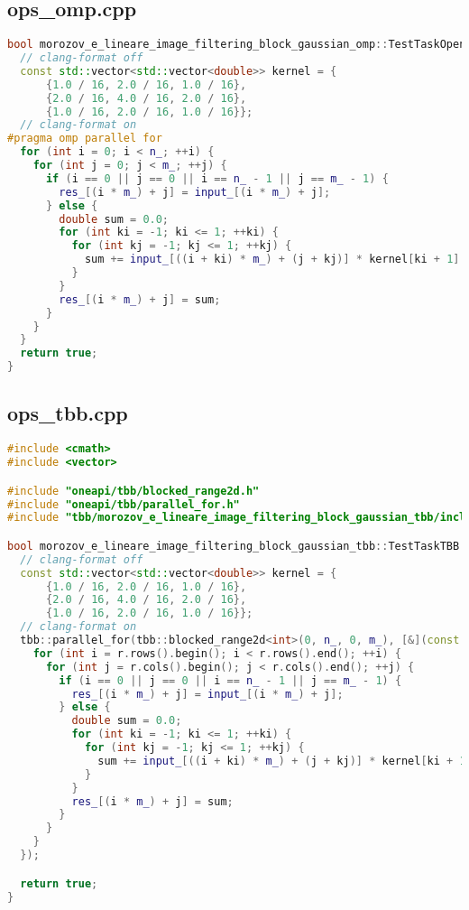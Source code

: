 \documentclass[a4paper,12pt]{article}
\begin{document}
\subsection{ops\_omp.cpp}
\begin{lstlisting}[language=C++]
bool morozov_e_lineare_image_filtering_block_gaussian_omp::TestTaskOpenMP::RunImpl() {
  // clang-format off
  const std::vector<std::vector<double>> kernel = {
      {1.0 / 16, 2.0 / 16, 1.0 / 16},
      {2.0 / 16, 4.0 / 16, 2.0 / 16},
      {1.0 / 16, 2.0 / 16, 1.0 / 16}};
  // clang-format on
#pragma omp parallel for
  for (int i = 0; i < n_; ++i) {
    for (int j = 0; j < m_; ++j) {
      if (i == 0 || j == 0 || i == n_ - 1 || j == m_ - 1) {
        res_[(i * m_) + j] = input_[(i * m_) + j];
      } else {
        double sum = 0.0;
        for (int ki = -1; ki <= 1; ++ki) {
          for (int kj = -1; kj <= 1; ++kj) {
            sum += input_[((i + ki) * m_) + (j + kj)] * kernel[ki + 1][kj + 1];
          }
        }
        res_[(i * m_) + j] = sum;
      }
    }
  }
  return true;
}
\end{lstlisting}

\subsection{ops\_tbb.cpp}
\begin{lstlisting}[language=C++]
#include <cmath>
#include <vector>

#include "oneapi/tbb/blocked_range2d.h"
#include "oneapi/tbb/parallel_for.h"
#include "tbb/morozov_e_lineare_image_filtering_block_gaussian_tbb/include/ops_tbb.hpp"

bool morozov_e_lineare_image_filtering_block_gaussian_tbb::TestTaskTBB::RunImpl() {
  // clang-format off
  const std::vector<std::vector<double>> kernel = {
      {1.0 / 16, 2.0 / 16, 1.0 / 16},
      {2.0 / 16, 4.0 / 16, 2.0 / 16},
      {1.0 / 16, 2.0 / 16, 1.0 / 16}};
  // clang-format on
  tbb::parallel_for(tbb::blocked_range2d<int>(0, n_, 0, m_), [&](const tbb::blocked_range2d<int> &r) {
    for (int i = r.rows().begin(); i < r.rows().end(); ++i) {
      for (int j = r.cols().begin(); j < r.cols().end(); ++j) {
        if (i == 0 || j == 0 || i == n_ - 1 || j == m_ - 1) {
          res_[(i * m_) + j] = input_[(i * m_) + j];
        } else {
          double sum = 0.0;
          for (int ki = -1; ki <= 1; ++ki) {
            for (int kj = -1; kj <= 1; ++kj) {
              sum += input_[((i + ki) * m_) + (j + kj)] * kernel[ki + 1][kj + 1];
            }
          }
          res_[(i * m_) + j] = sum;
        }
      }
    }
  });

  return true;
}
\end{lstlisting}
\end{document}
